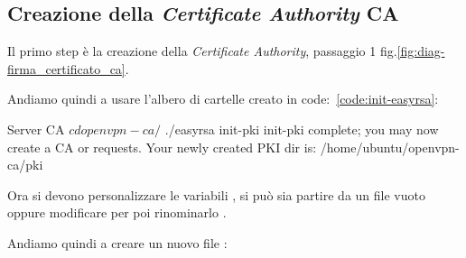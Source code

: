 \subsection{Creazione della \textit{Certificate Authority} CA \ok} %

Il primo step è la creazione della \textit{Certificate Authority}, passaggio 1 fig.\ref{fig:diag-firma_certificato_ca}. 

Andiamo quindi a usare l'albero di cartelle creato in code:~\ref{code:init-easyrsa}:

\begin{bashcode}{Server CA}{}
$ cd openvpn-ca/
$ ./easyrsa init-pki
init-pki complete; you may now create a CA or requests.
Your newly created PKI dir is: /home/ubuntu/openvpn-ca/pki
\end{bashcode}

Ora si devono personalizzare le variabili , si può sia partire da un file vuoto oppure modificare  per poi rinominarlo .

Andiamo quindi a creare un nuovo file :




